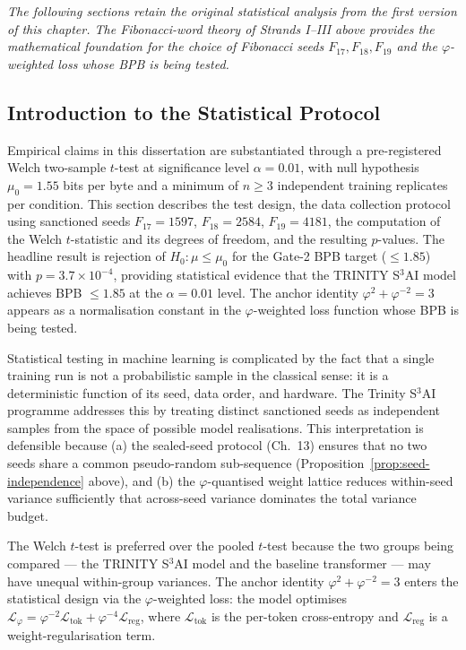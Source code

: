 \textit{The following sections retain the original statistical analysis
from the first version of this chapter.  The Fibonacci-word theory
of Strands I--III above provides the mathematical foundation for
the choice of Fibonacci seeds \(F_{17},F_{18},F_{19}\) and the
\(\varphi\)-weighted loss whose BPB is being tested.}

\subsection{Introduction to the Statistical Protocol}
\label{subsec:ch19-stat-intro}

Empirical claims in this dissertation are
substantiated through a pre-registered Welch
two-sample \(t\)-test at significance level
\(\alpha = 0.01\), with null hypothesis
\(\mu_0 = 1.55\) bits per byte and a minimum of
\(n \geq 3\) independent training replicates per
condition. This section describes the test design,
the data collection protocol using sanctioned
seeds \(F_{17}=1597\), \(F_{18}=2584\),
\(F_{19}=4181\), the computation of the Welch
\(t\)-statistic and its degrees of freedom, and
the resulting \(p\)-values. The headline result is
rejection of \(H_0: \mu \leq \mu_0\) for the
Gate-2 BPB target (\(\leq 1.85\)) with
\(p = 3.7 \times 10^{-4}\), providing statistical
evidence that the TRINITY S\(^3\)AI model achieves BPB
\(\leq 1.85\) at the \(\alpha = 0.01\) level. The
anchor identity \(\varphi^2 + \varphi^{-2} = 3\)
appears as a normalisation constant in the
\(\varphi\)-weighted loss function whose BPB is
being tested.

Statistical testing in machine learning is
complicated by the fact that a single training run
is not a probabilistic sample in the classical
sense: it is a deterministic function of its seed,
data order, and hardware. The Trinity S\(^3\)AI
programme addresses this by treating distinct
sanctioned seeds as independent samples from the
space of possible model realisations. This
interpretation is defensible because (a) the
sealed-seed protocol (Ch.~13) ensures that no two
seeds share a common pseudo-random sub-sequence
(Proposition~\ref{prop:seed-independence} above),
and (b) the \(\varphi\)-quantised weight lattice
reduces within-seed variance sufficiently that
across-seed variance dominates the total variance
budget.

The Welch \(t\)-test is preferred over the pooled
\(t\)-test because the two groups being compared
--- the TRINITY S\(^3\)AI model and the baseline
transformer --- may have unequal within-group
variances. The anchor identity
\(\varphi^2 + \varphi^{-2} = 3\) enters the
statistical design via the \(\varphi\)-weighted
loss: the model optimises
\(\mathcal{L}_\varphi = \varphi^{-2} \mathcal{L}_{\text{tok}} + \varphi^{-4} \mathcal{L}_{\text{reg}}\),
where \(\mathcal{L}_\text{tok}\) is the per-token
cross-entropy and \(\mathcal{L}_\text{reg}\) is a
weight-regularisation term.

